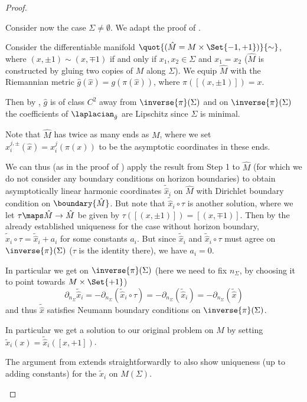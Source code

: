\documentclass[titlepage,numbers=noenddot,oneside,%
cleardoublepage=empty,paper=a4,fontsize=11pt,%
english,%
]{scrartcl}
\begin{document}
\begin{proof}
\begin{proofenumerate}[label=\textbf{Step \arabic*.}]
        \item Consider now the case \( \Sigma\neq \emptyset \). We adapt the proof of \cite[Proposition 46]{eichmairDoublingAsymptoticallyFlat2023}.

        Consider the differentiable manifold \( \quot{(\hat{M}=M\times \Set{-1,+1})}{\sim} \), where \( (x,\pm 1)\sim (x,\mp 1) \) if and only if \( x_1,x_2\in \Sigma \) and \( x_1=x_2 \) (\ie \( \hat{M} \) is constructed by gluing two copies of \( M \) along \( \Sigma \)). We equip \( \hat{M} \) with the Riemannian metric \( \hat{g}(\hat{x})=g(\pi(\hat{x})) \), where \( \pi([(x,\pm 1)])=x \).
        
        Then by \cite[Lemma 19]{eichmairDoublingAsymptoticallyFlat2023}, \( \hat{g} \) is of class \( C^2 \) away from \( \inverse{\pi}(\Sigma) \) and on \( \inverse{\pi}(\Sigma) \) the coefficients of \( \laplacian_{\tilde{g}} \) are Lipschitz since \( \Sigma \) is minimal.

        Note that \( \hat{M} \) has twice as many ends as \( M \), where we set \( \hat{x}_{i}^{j,\pm}(\hat{x})=x_i^j(\pi(x)) \) to be the asymptotic coordinates in these ends.

        We can thus (as in the proof of \cite[Proposition 46]{eichmairDoublingAsymptoticallyFlat2023}) apply the result from Step 1 to \( \hat{M} \) (for which we do not consider any boundary conditions on horizon boundaries) to obtain asymptotically linear harmonic coordinates \( \tilde{\hat{x}}_i \) on \( \hat{M} \) with Dirichlet boundary condition on \( \boundary{\hat{M}} \). But note that \( \tilde{\hat{x}}_i\circ \tau \) is another solution, where we let \( \tau\maps \hat{M}\to \hat{M} \) be given by \( \tau([(x,\pm 1)])=[(x,\mp 1)] \). Then by the already established uniqueness for the case without horizon boundary, \( \tilde{\hat{x}}_i\circ \tau=\tilde{\hat{x}}_i+a_i \) for some constants \( a_i \). But since \( \tilde{\hat{x}}_i \) and \( \tilde{\hat{x}}_i\circ \tau \) must agree on \( \inverse{\pi}(\Sigma) \) (\( \tau \) is the identity there), we have \( a_i=0 \).
        
        In particular we get on \( \inverse{\pi}(\Sigma) \) (here we need to fix \( n_{\Sigma} \), by \eg choosing it to point towards \( M\times \Set{+1} \))
        \begin{equation*}
            \partial_{n_{\Sigma}}\tilde{\hat{x}}_i=-\partial_{n_\Sigma}(\tilde{\hat{x}}_i\circ \tau)=-\partial_{n_\Sigma}(\tilde{\hat{x}}_i)=-\partial_{n_\Sigma}(\tilde{\hat{x}})
        \end{equation*}
        and thus \( \tilde{\hat{x}} \) satisfies Neumann boundary conditions on \( \inverse{\pi}(\Sigma) \).

        In particular we get a solution to our original problem on \( M \) by setting \( \tilde{x}_i(x)=\tilde{\hat{x}}_i([x,+1]) \).

        The argument from \cite[Proposition 3.9]{eichmairDoublingAsymptoticallyFlat2023} extends straightforwardly to also show uniqueness (up to adding constants) for the \( \tilde{x}_i \) on \( M(\Sigma) \).  
    \end{proofenumerate}
\end{proof}
\end{document}
